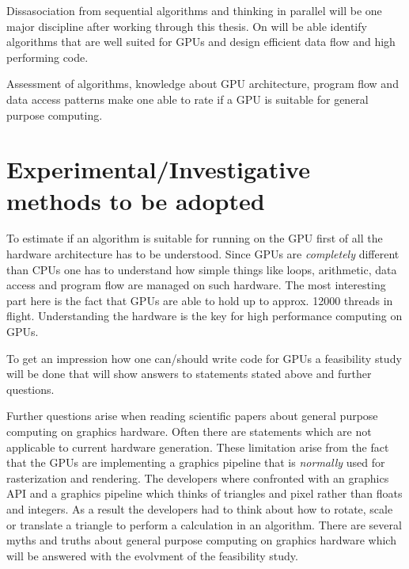 
Dissasociation from sequential algorithms and thinking in parallel will be one
major discipline after working through this thesis. On will be able identify
algorithms that are well suited for GPUs and design efficient data flow and high
performing code.

Assessment of algorithms, knowledge about \gls{GPU} architecture, program flow and
data access patterns make one able to rate if a \gls{GPU} is suitable for general
purpose computing.

\section*{Experimental/Investigative methods to be adopted} 
\label{ssub:experimental_investigative_methods_to_be_adopted} 
To estimate if an algorithm is suitable for running on the \gls{GPU} first of all the
hardware architecture has to be understood. Since GPUs are \emph{completely}
different than CPUs one has to understand how simple things like loops,
arithmetic, data access and program flow are managed on such hardware. The most
interesting part here is the fact that GPUs are able to hold up to approx. 12000
threads in flight. Understanding the hardware is the key for high performance 
computing on GPUs.

To get an impression how one can/should write code for GPUs a feasibility study
will be done that will show answers to statements stated above and further 
questions. 

Further questions arise when reading scientific papers about general purpose
computing on graphics hardware. Often there are statements which are not
applicable to current hardware generation. These limitation arise from the fact
that the GPUs are implementing a graphics pipeline that is \emph{normally} used
for rasterization and rendering. The developers where confronted with an
graphics API and a graphics pipeline which thinks of triangles and pixel rather
than floats and integers. As a result the developers had to think about how to
rotate, scale or translate a triangle to perform a calculation in an algorithm.
There are several myths and truths about general purpose computing on graphics 
hardware which will be answered with the evolvment of the feasibility study. 

